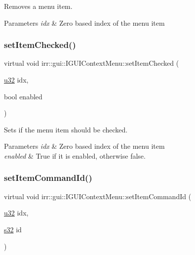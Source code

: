 Removes a menu item. 


\begin{DoxyParams}{Parameters}
{\em idx} & Zero based index of the menu item \\
\hline
\end{DoxyParams}
\mbox{\label{classirr_1_1gui_1_1IGUIContextMenu_a8abbd1587dcc462f60660d7e606e954e}} 
\subsubsection{\texorpdfstring{set\+Item\+Checked()}{setItemChecked()}}
{\footnotesize\ttfamily virtual void irr\+::gui\+::\+I\+G\+U\+I\+Context\+Menu\+::set\+Item\+Checked (\begin{DoxyParamCaption}\item[{\hyperlink{namespaceirr_a0416a53257075833e7002efd0a18e804}{u32}}]{idx,  }\item[{bool}]{enabled }\end{DoxyParamCaption})\hspace{0.3cm}{\ttfamily [pure virtual]}}



Sets if the menu item should be checked. 


\begin{DoxyParams}{Parameters}
{\em idx} & Zero based index of the menu item \\
\hline
{\em enabled} & True if it is enabled, otherwise false. \\
\hline
\end{DoxyParams}
\mbox{\label{classirr_1_1gui_1_1IGUIContextMenu_a1380ff56d8c4c5b8de8d221062464654}} 
\subsubsection{\texorpdfstring{set\+Item\+Command\+Id()}{setItemCommandId()}}
{\footnotesize\ttfamily virtual void irr\+::gui\+::\+I\+G\+U\+I\+Context\+Menu\+::set\+Item\+Command\+Id (\begin{DoxyParamCaption}\item[{\hyperlink{namespaceirr_a0416a53257075833e7002efd0a18e804}{u32}}]{idx,  }\item[{\hyperlink{namespaceirr_ac66849b7a6ed16e30ebede579f9b47c6}{s32}}]{id }\end{DoxyParamCaption})\hspace{0.3cm}{\ttfamily [pure virtual]}}



